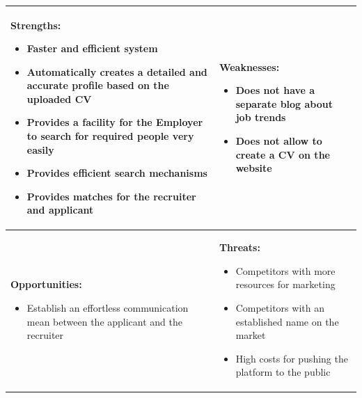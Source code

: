 \begin{longtable}[h!]
\centering
\label{table:swot}

\caption{SWOT Analysis.}
\endfirsthead



    \begin{tabular}{|p{7.5cm}|p{7.5cm}|}
    \hline
    
    \textbf{Strengths:}
    
    \begin{itemize}
        \item Faster and efficient system 
        \item Automatically creates a detailed and accurate profile based on the uploaded CV
        \item Provides a facility for the Employer to search for required people very easily 
        \item Provides efficient search mechanisms
        \item Provides matches for the recruiter and applicant 
    \end{itemize}
    
    & \textbf{Weaknesses:}
    
    \begin{itemize}
        \item Does not have a separate blog about job trends
        \item Does not allow to create a CV on the website
    \end{itemize}
        
    \\ \hline
    \textbf{Opportunities:}
    
    \begin{itemize}
        \item Establish an effortless communication mean between the applicant and the recruiter 
    \end{itemize}
        
    & \textbf{Threats:} 
    
    \begin{itemize}
        \item Competitors with more resources for marketing
        \item Competitors with an established name on the market
        \item High costs for pushing the platform to the public
    \end{itemize}
         
    \\ \hline
    \end{tabular}
\end{longtable}

